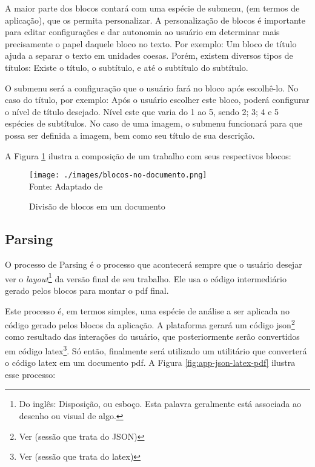 A maior parte dos blocos contará com uma espécie de submenu, (em termos de aplicação),
que os permita personalizar. A personalização de blocos é importante para editar
configurações e dar autonomia ao usuário em determinar mais precisamente o papel
daquele bloco no texto. Por exemplo: Um bloco de título ajuda a separar o texto
em unidades coesas. Porém, existem diversos tipos de títulos: Existe o título, o
subtítulo, e até o subtítulo do subtítulo.

O submenu será a configuração que o usuário fará no bloco após escolhê-lo. No
caso do título, por exemplo: Após o usuário escolher este bloco, poderá configurar
o nível de título desejado. Nível este que varia do 1 ao 5, sendo 2; 3; 4 e 5
espécies de subtítulos. No caso de uma imagem, o submenu funcionará para que possa
ser definida a imagem, bem como seu título de sua descrição.

A
Figura \ref{fig:blocos-no-documento}
ilustra a composição de um trabalho com seus respectivos blocos:

\begin{figure}[H]
    \centering
    \caption{Divisão de blocos em um documento}
    \texttt{[image: ./images/blocos-no-documento.png]}
    \label{fig:blocos-no-documento} \\
    \textnormal{\fontsize{10pt}{12pt}Fonte: Adaptado de \cite{pucgo}}
\end{figure}

\subsection{Parsing}

O processo de Parsing é o processo que acontecerá sempre que o usuário desejar
ver o
\textit{layout}\footnote{Do inglês: Disposição, ou esboço. Esta palavra geralmente está associada ao desenho ou visual de algo.
}
da versão final de seu trabalho. Ele usa o código intermediário gerado pelos blocos para montar o
\acrshort{pdf}
final.

Este processo é, em termos simples, uma espécie de análise a ser aplicada no código gerado pelos blocos
da aplicação. A plataforma gerará um código
\acrshort{json}\footnote{Ver (sessão que trata do JSON)
}
como resultado das interações do usuário, que posteriormente
serão convertidos em código
\acrshort{latex}\footnote{Ver (sessão que trata do \acrshort{latex})
}.
Só então, finalmente será utilizado um utilitário que converterá o código \acrshort{latex}
em um documento
\acrshort{pdf}. A
Figura \ref{fig:app-json-latex-pdf} ilustra esse processo:

